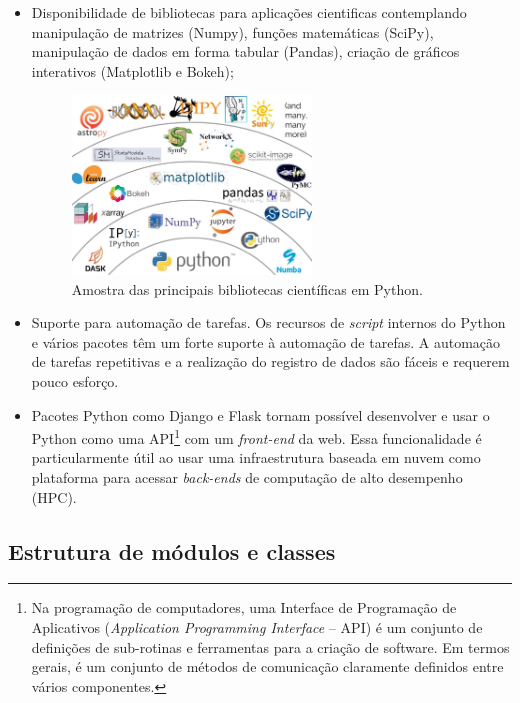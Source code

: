 \begin{itemize}
    \item Disponibilidade de bibliotecas para aplicações cientificas contemplando manipulação de matrizes (Numpy), funções matemáticas (SciPy), manipulação de dados em forma tabular (Pandas), criação de gráficos interativos (Matplotlib e Bokeh);
    
    \begin{figure}[!ht]
        \centering
        \caption{Amostra das principais bibliotecas científicas em Python.}\label{fig:python_ecosystem}
        \includegraphics[width=0.6\textwidth]{imagens/python_ecosystem}
    \end{figure}

    \item Suporte para automação de tarefas. Os recursos de \textit{script} internos do Python e vários pacotes têm um forte suporte à automação de tarefas. A automação de tarefas repetitivas e a realização do registro de dados são fáceis e requerem pouco esforço.
    
    \item Pacotes Python como Django e Flask tornam possível desenvolver e usar o Python como uma API\footnote{Na programação de computadores, uma Interface de Programação de Aplicativos (\textit{Application Programming Interface} -- API) é um conjunto de definições de sub-rotinas e ferramentas para a criação de software. Em termos gerais, é um conjunto de métodos de comunicação claramente definidos entre vários componentes.} com um \textit{front-end} da web. Essa funcionalidade é particularmente útil ao usar uma infraestrutura baseada em nuvem como plataforma para acessar \textit{back-ends} de computação de alto desempenho (HPC).
\end{itemize}


\subsection{Estrutura de módulos e classes}

